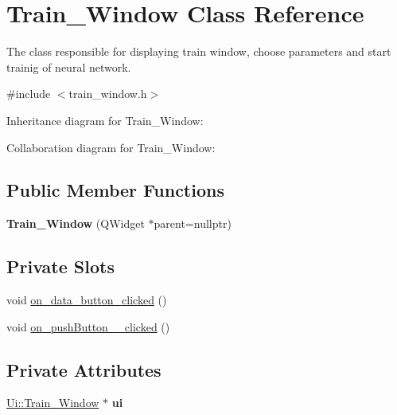 \hypertarget{class_train___window}{}\section{Train\+\_\+\+Window Class Reference}
\label{class_train___window}


The class responsible for displaying train window, choose parameters and start trainig of neural network.  




{\ttfamily \#include $<$train\+\_\+window.\+h$>$}



Inheritance diagram for Train\+\_\+\+Window\+:


Collaboration diagram for Train\+\_\+\+Window\+:
\subsection*{Public Member Functions}
\begin{DoxyCompactItemize}
\item 
\mbox{\label{class_train___window_a2afb72b76fd8f3270b001b4054795ba9}} 
{\bfseries Train\+\_\+\+Window} (Q\+Widget $\ast$parent=nullptr)
\end{DoxyCompactItemize}
\subsection*{Private Slots}
\begin{DoxyCompactItemize}
\item 
void \hyperlink{class_train___window_a47d45f384226cde0801d7b44cf41bdea}{on\+\_\+data\+\_\+button\+\_\+clicked} ()
\item 
void \hyperlink{class_train___window_aab0ec830048b674fd6290900eca39b8c}{on\+\_\+push\+Button\+\_\+\_\+clicked} ()
\end{DoxyCompactItemize}
\subsection*{Private Attributes}
\begin{DoxyCompactItemize}
\item 
\mbox{\label{class_train___window_af1069aeda6458149040bc719c49b283d}} 
\hyperlink{class_ui_1_1_train___window}{Ui\+::\+Train\+\_\+\+Window} $\ast$ {\bfseries ui}
\end{DoxyCompactItemize}


